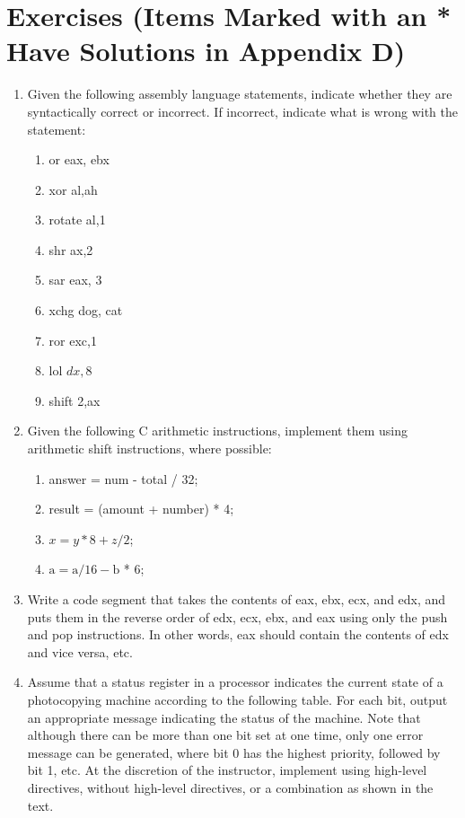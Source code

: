 \documentclass[10pt]{book}
\begin{document}
\section{Exercises (Items Marked with an * Have Solutions in Appendix D)}
\begin{enumerate}
  \item Given the following assembly language statements, indicate whether they are syntactically correct or incorrect. If incorrect, indicate what is wrong with the statement:
    \begin{enumerate}
      \item[*A.] or eax, ebx
      \item[B.] xor al,ah
      \item[*C.] rotate al,1
      \item[D.] shr ax,2
      \item[*E.] sar eax, 3
      \item[F.] xchg dog, cat
      \item[G.] ror exc,1
      \item[H.] lol $d x, 8$
      \item[I.] shift 2,ax
    \end{enumerate}
  \item Given the following C arithmetic instructions, implement them using arithmetic shift instructions, where possible:
    \begin{enumerate}
      \item[A.] answer = num - total / 32;
      \item[*B.] result = (amount + number) * 4;
      \item[C.] $x=y * 8+z / 2$;
      \item[D.] $\mathrm{a}=\mathrm{a} / 16-\mathrm{b}$ * 6;
    \end{enumerate}
  \item Write a code segment that takes the contents of eax, ebx, ecx, and edx, and puts them in the reverse order of edx, ecx, ebx, and eax using only the push and pop instructions. In other words, eax should contain the contents of edx and vice versa, etc.
  \item Assume that a status register in a processor indicates the current state of a photocopying machine according to the following table. For each bit, output an appropriate message indicating the status of the machine. Note that although there can be more than one bit set at one time, only one error message can be generated, where bit 0 has the highest priority, followed by bit 1, etc. At the discretion of the instructor, implement using high-level directives, without high-level directives, or a combination as shown in the text.


\end{enumerate}
\end{document}
